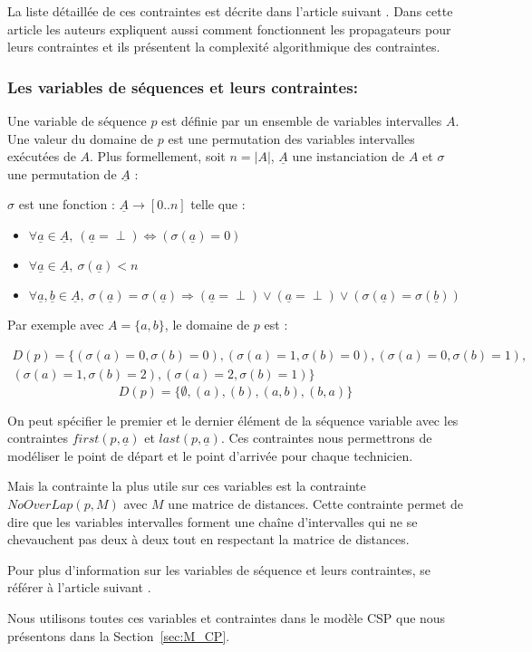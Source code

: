 La liste détaillée de ces contraintes est décrite dans l'article suivant \cite{Laborie2008}.
Dans cette article les auteurs expliquent aussi comment fonctionnent les propagateurs pour leurs contraintes et ils présentent la complexité algorithmique des contraintes.


\subsubsection{Les variables de séquences et leurs contraintes:}
\begin{mydef}
Une variable de séquence $p$ est définie par un ensemble de variables intervalles $A$.
Une valeur du domaine de $p$ est une permutation des variables intervalles exécutées de $A$.
Plus formellement, soit $n=|A|$, $\underline{A}$ une instanciation de $A$ et $\sigma$ une permutation de $\underline{A}$ :

$\sigma$ est une fonction : $\underline{A} \rightarrow [0..n]$ telle que : 
\begin{itemize}
\item $\forall \underline{a} \in \underline{A},~(\underline{a} = \perp) \Leftrightarrow (\sigma(\underline{a})=0) $
\item $\forall \underline{a} \in \underline{A},~\sigma(\underline{a}) < n $
\item $\forall \underline{a},\underline{b} \in \underline{A},~\sigma(\underline{a}) = \sigma(\underline{a}) \Rightarrow (\underline{a} = \perp)\lor (\underline{a} = \perp) \lor   (\sigma(\underline{a}) = \sigma(\underline{b})) $
\end{itemize}
\label{def:sequence}
\end{mydef}
Par exemple avec $A=\{a,b\}$, le domaine de $p$ est : 

\begin{equation*}
\begin{split}
D(p) =\{(\sigma(a) =0,\sigma(b) =0),(\sigma(a) =1,\sigma(b) =0),(\sigma(a) =0,\sigma(b) =1),\\(\sigma(a) =1,\sigma(b) =2),(\sigma(a) =2,\sigma(b) =1)\} 
\end{split}
\end{equation*}
$$D(p) = \{\emptyset,(a),(b),(a,b),(b,a)\}$$

On peut spécifier le premier et le dernier élément de la séquence variable avec les contraintes $first(p,\underline{a})$ et $last(p,\underline{a})$. 
Ces contraintes nous permettrons de modéliser le point de départ et le point d'arrivée pour chaque technicien.

Mais la contrainte la plus utile sur ces variables est la contrainte $NoOverLap(p,M)$ avec $M$ une matrice de distances. 
Cette contrainte permet de dire que les variables intervalles forment une chaîne d'intervalles qui ne se chevauchent pas deux à deux tout en respectant la matrice de distances.

Pour plus d'information sur les variables de séquence et leurs contraintes, se référer à l'article suivant \cite{Laborie2009}.



Nous utilisons toutes ces variables et contraintes dans le modèle CSP que nous présentons dans la Section~\ref{sec:M_CP}.





